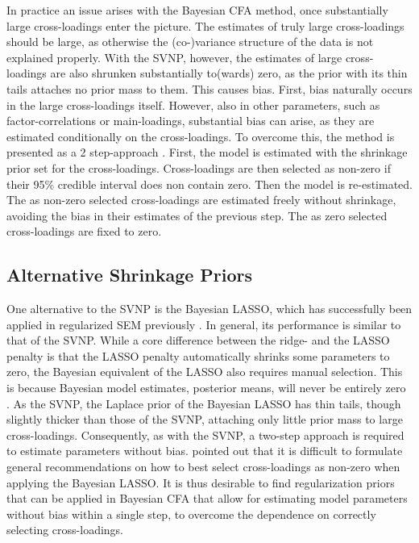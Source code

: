 \documentclass[]{interact}
\theoremstyle{plain}%
\theoremstyle{definition}
\theoremstyle{remark}
\begin{document}
In practice an issue arises with the Bayesian CFA method, once
substantially large cross-loadings enter the picture. The estimates of
truly large cross-loadings should be large, as otherwise the
(co-)variance structure of the data is not explained properly. With the
SVNP, however, the estimates of large cross-loadings are also shrunken
substantially to(wards) zero, as the prior with its thin tails attaches
no prior mass to them. This causes bias. First, bias naturally occurs in
the large cross-loadings itself. However, also in other parameters, such
as factor-correlations or main-loadings, substantial bias can arise, as
they are estimated conditionally on the cross-loadings. To overcome
this, the method is presented as a 2 step-approach
\citep{muthen_bayesian_2012}. First, the model is estimated with the
shrinkage prior set for the cross-loadings. Cross-loadings are then
selected as non-zero if their 95\% credible interval does non contain
zero. Then the model is re-estimated. The as non-zero selected
cross-loadings are estimated freely without shrinkage, avoiding the bias
in their estimates of the previous step. The as zero selected
cross-loadings are fixed to zero.

\hypertarget{alternative-shrinkage-priors}{%
\subsection{Alternative Shrinkage
Priors}\label{alternative-shrinkage-priors}}

One alternative to the SVNP is the Bayesian LASSO, which has
successfully been applied in regularized SEM previously
\citep{chen_jinsong_partially_2021, zhang_criteria_2021}. In general,
its performance is similar to that of the SVNP. While a core difference
between the ridge- and the LASSO penalty is that the LASSO penalty
automatically shrinks some parameters to zero, the Bayesian equivalent
of the LASSO also requires manual selection. This is because Bayesian
model estimates, posterior means, will never be entirely zero
\citep{zhang_criteria_2021}. As the SVNP, the Laplace prior of the
Bayesian LASSO has thin tails, though slightly thicker than those of the
SVNP, attaching only little prior mass to large cross-loadings.
Consequently, as with the SVNP, a two-step approach is required to
estimate parameters without bias. \citet{zhang_criteria_2021} pointed
out that it is difficult to formulate general recommendations on how to
best select cross-loadings as non-zero when applying the Bayesian LASSO.
It is thus desirable to find regularization priors that can be applied
in Bayesian CFA that allow for estimating model parameters without bias
within a single step, to overcome the dependence on correctly selecting
cross-loadings.
\end{document}
